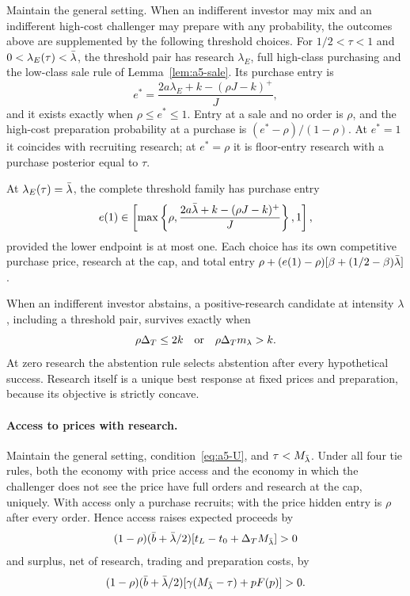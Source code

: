 \renewcommand{\theremark}{A.\arabic{remark}}
\begin{remark}\label{rem:researchties}
Maintain the general setting. When an indifferent investor may mix and an indifferent high-cost challenger may
prepare with any probability, the outcomes above are supplemented by the following threshold choices.
For \(1/2<\tau<1\) and \(0<\lambda_E(\tau)<\bar\lambda\), the threshold pair has research \(\lambda_E\), full high-class
purchasing and the low-class sale rule of Lemma~\ref{lem:a5-sale}. Its purchase entry is
\[
 e^*=\frac{2a\lambda_E+k-(\rho J-k)^+}{J},
\]
and it exists exactly when \(\rho\le e^*\le1\). Entry at a sale and no order is \(\rho\), and the high-cost
preparation probability at a purchase is \((e^*-\rho)/(1-\rho)\). At \(e^*=1\) it coincides with recruiting
research; at \(e^*=\rho\) it is floor-entry research with a purchase posterior equal to \(\tau\).

At \(\lambda_E(\tau)=\bar\lambda\), the complete threshold family has purchase entry
\[
 e(1)\in\left[\max\left\{\rho,\frac{2a\bar\lambda+k-(\rho J-k)^+}{J}\right\},1\right],
\]
provided the lower endpoint is at most one. Each choice has its own competitive purchase price, research at the
cap, and total entry \(\rho+(e(1)-\rho)[\beta+(1/2-\beta)\bar\lambda]\).

When an indifferent investor abstains, a positive-research candidate at intensity \(\lambda\), including a
threshold pair, survives exactly when
\[
 \rho\Delta_T\le2k\quad\hbox{or}\quad\rho\Delta_T m_\lambda>k.
\]
At zero research the abstention rule selects abstention after every hypothetical success. Research itself is a
unique best response at fixed prices and preparation, because its objective is strictly concave.
\end{remark}

\paragraph{Access to prices with research.}
Maintain the general setting, condition~\eqref{eq:a5-U}, and \(\tau<M_{\bar\lambda}\). Under all four tie rules, both the
economy with price access and the economy in which the challenger does not see the price have full orders and
research at the cap, uniquely. With access only a purchase recruits; with the price hidden entry is \(\rho\)
after every order. Hence access raises expected proceeds by
\[
 (1-\rho)(\bar b+\bar\lambda/2)[t_L-t_0+\Delta_T M_{\bar\lambda}]>0
\]
and surplus, net of research, trading and preparation costs, by
\[
 (1-\rho)(\bar b+\bar\lambda/2)[\gamma(M_{\bar\lambda}-\tau)+pF(p)]>0.
\]

